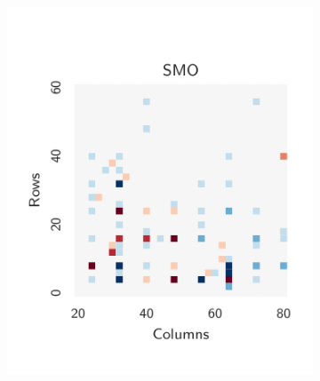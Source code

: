 \documentclass[nonatbib,preprint,10pt]{sigplanconf}
\begin{document}
\begin{figure}
\begin{subfigure}[t]{0.48\columnwidth}
\vspace{-1.5em} %
\caption{}
\label{fig:class-hmaps-3}
\end{subfigure}
\begin{subfigure}[t]{0.48\columnwidth}
\centering
\includegraphics[width=\columnwidth]{img/heatmap_5}
\vspace{-1.5em} %
\caption{}
\label{fig:class-hmaps-4}
\end{subfigure}
\\
\begin{subfigure}[t]{0.48\columnwidth}
\centering

\end{subfigure}
\end{figure}
\end{document}
